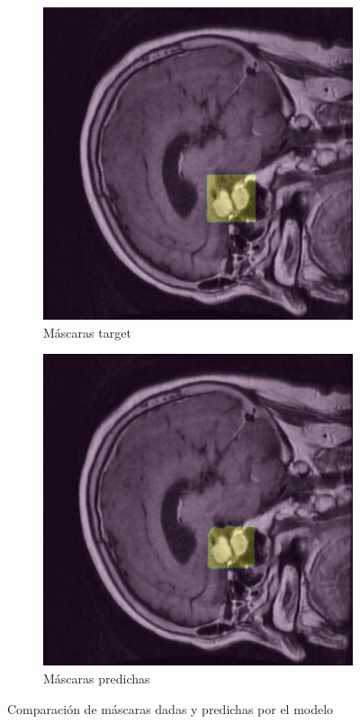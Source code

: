 \begin{figure}[H]
    \begin{subfigure}{0.45\textwidth}
        \includegraphics[width=\linewidth]{chapters/segmentacion/images/5.png}
        \caption*{Máscaras target}
    \end{subfigure}
    \hfill
    \begin{subfigure}{0.45\textwidth}
        \includegraphics[width=\linewidth]{chapters/segmentacion/images/6.png}
       \caption*{Máscaras predichas}
    \end{subfigure}
    \caption{Comparación de máscaras dadas y predichas por el modelo}
    \label{fig.imagenes}
\end{figure}















